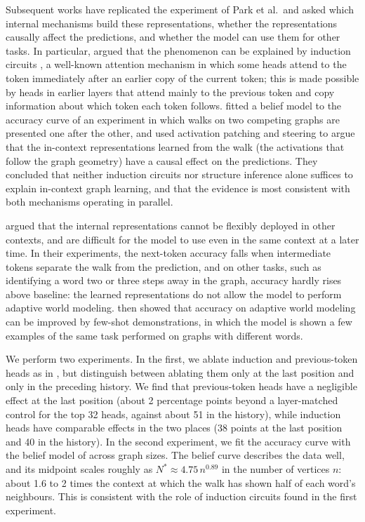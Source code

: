 \documentclass[11pt,a4paper]{article}
\begin{document}
Subsequent works have replicated the experiment of Park et al.\ and asked which internal mechanisms build these
representations, whether the representations causally affect the predictions, and whether the model can use them for
other tasks. In particular, \citet{arditi2026} argued that the phenomenon can be explained by induction circuits
\citep{olsson2022}, a well-known attention mechanism in which some heads attend to the token immediately after an
earlier copy of the current token; this is made possible by heads in earlier layers that attend mainly to the previous
token and copy information about which token each token follows. \citet{kowalyshyn2026} fitted a belief model to the
accuracy curve of an experiment in which walks on two competing graphs are presented one after the other, and used
activation patching and steering to argue that the in-context representations learned from the walk (the activations
that follow the graph geometry) have a causal effect on the predictions. They concluded that neither induction circuits
nor structure inference alone suffices to explain in-context graph learning, and that the evidence is most consistent
with both mechanisms operating in parallel.

\citet{lepori2026} argued that the internal representations cannot be flexibly deployed in other contexts, and are
difficult for the model to use even in the same context at a later time. In their experiments, the next-token accuracy
falls when intermediate tokens separate the walk from the prediction, and on other tasks, such as identifying a word
two or three steps away in the graph, accuracy hardly rises above baseline: the learned representations do not allow
the model to perform adaptive world modeling. \citet{matsutani2026} then showed that accuracy on adaptive world
modeling can be improved by few-shot demonstrations, in which the model is shown a few examples of the same task
performed on graphs with different words.

We perform two experiments. In the first, we ablate induction and previous-token heads as in \citet{arditi2026}, but
distinguish between ablating them only at the last position and only in the preceding history. We find that
previous-token heads have a negligible effect at the last position (about 2 percentage points beyond a layer-matched
control for the top 32 heads, against about 51 in the history), while induction heads have comparable effects in the
two places (38 points at the last position and 40 in the history). In the second experiment, we fit the accuracy curve
with the belief model of \citet{kowalyshyn2026} across graph sizes. The belief curve describes the data well, and its
midpoint scales roughly as $N^* \approx 4.75\, n^{0.89}$ in the number of vertices $n$: about 1.6 to 2 times the
context at which the walk has shown half of each word's neighbours. This is consistent with the role of induction
circuits found in the first experiment.
\end{document}
